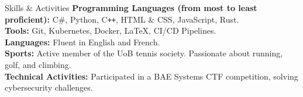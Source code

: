 \documentclass{resume} %
\begin{document}

\begin{rSection}{Skills \& Activities}
\textbf{Programming Languages (from most to least proficient):} C\#, Python, C\texttt{++}, HTML \& CSS, JavaScript, Rust. \\
\textbf{Tools:} Git, Kubernetes, Docker, LaTeX, CI/CD Pipelines. \\
\textbf{Languages:} Fluent in English and French. \\
\textbf{Sports:} Active member of the UoB tennis society. Passionate about running, golf, and climbing.\\
\textbf{Technical Activities:} Participated in a BAE Systems CTF competition, solving cybersecurity challenges.

\end{rSection}
\end{document}
